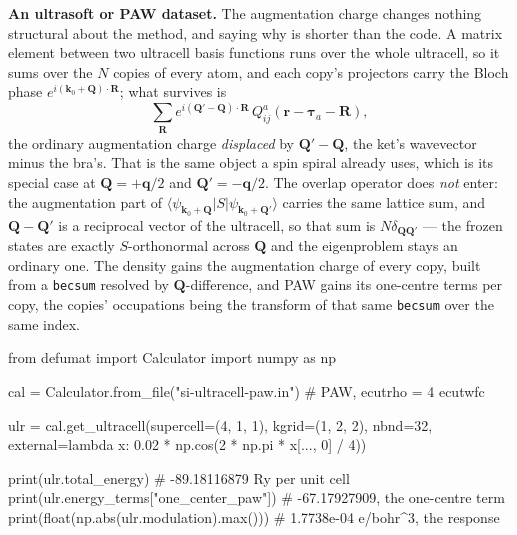 \documentclass[11pt,a4paper]{article}
\newcommand{\code}[1]{\texttt{\small #1}}
\begin{document}
\textbf{An ultrasoft or PAW dataset.} The augmentation charge changes nothing
structural about the method, and saying why is shorter than the code. A matrix
element between two ultracell basis functions runs over the whole ultracell, so
it sums over the $N$ copies of every atom, and each copy's projectors carry the
Bloch phase $e^{i(\mathbf k_0+\mathbf Q)\cdot\mathbf R}$; what survives is
\[
  \sum_{\mathbf R} e^{i(\mathbf Q'-\mathbf Q)\cdot\mathbf R}\,
  Q^a_{ij}(\mathbf r - \boldsymbol\tau_a - \mathbf R),
\]
the ordinary augmentation charge \emph{displaced} by $\mathbf Q' - \mathbf Q$,
the ket's wavevector minus the bra's. That is the same object a spin spiral
already uses, which is its special case at $\mathbf Q = +\mathbf q/2$ and
$\mathbf Q' = -\mathbf q/2$. The overlap operator does \emph{not} enter: the
augmentation part of $\langle\psi_{\mathbf k_0+\mathbf Q}|S|
\psi_{\mathbf k_0+\mathbf Q'}\rangle$ carries the same lattice sum, and
$\mathbf Q - \mathbf Q'$ is a reciprocal vector of the ultracell, so that sum is
$N\delta_{\mathbf Q\mathbf Q'}$ --- the frozen states are exactly
$S$-orthonormal across $\mathbf Q$ and the eigenproblem stays an ordinary one.
The density gains the augmentation charge of every copy, built from a
\code{becsum} resolved by $\mathbf Q$-difference, and PAW gains its one-centre
terms per copy, the copies' occupations being the transform of that same
\code{becsum} over the same index.

\begin{pycode}
from defumat import Calculator
import numpy as np

cal = Calculator.from_file("si-ultracell-paw.in")   # PAW, ecutrho = 4 ecutwfc

ulr = cal.get_ultracell(supercell=(4, 1, 1), kgrid=(1, 2, 2), nbnd=32,
                        external=lambda x: 0.02 * np.cos(2 * np.pi * x[..., 0] / 4))

print(ulr.total_energy)                       # -89.18116879 Ry per unit cell
print(ulr.energy_terms["one_center_paw"])     # -67.17927909, the one-centre term
print(float(np.abs(ulr.modulation).max()))    # 1.7738e-04 e/bohr^3, the response
\end{pycode}
\end{document}
